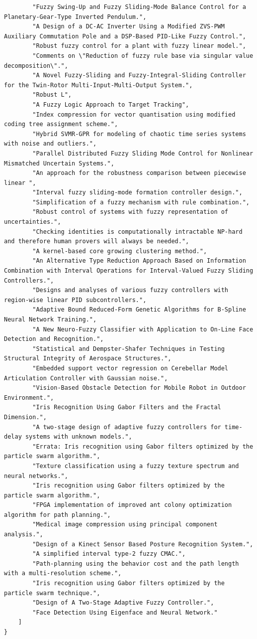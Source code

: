 \begin{verbatim}
        "Fuzzy Swing-Up and Fuzzy Sliding-Mode Balance Control for a Planetary-Gear-Type Inverted Pendulum.", 
        "A Design of a DC-AC Inverter Using a Modified ZVS-PWM Auxiliary Commutation Pole and a DSP-Based PID-Like Fuzzy Control.", 
        "Robust fuzzy control for a plant with fuzzy linear model.", 
        "Comments on \"Reduction of fuzzy rule base via singular value decomposition\".", 
        "A Novel Fuzzy-Sliding and Fuzzy-Integral-Sliding Controller for the Twin-Rotor Multi-Input-Multi-Output System.", 
        "Robust L", 
        "A Fuzzy Logic Approach to Target Tracking", 
        "Index compression for vector quantisation using modified coding tree assignment scheme.", 
        "Hybrid SVMR-GPR for modeling of chaotic time series systems with noise and outliers.", 
        "Parallel Distributed Fuzzy Sliding Mode Control for Nonlinear Mismatched Uncertain Systems.", 
        "An approach for the robustness comparison between piecewise linear ", 
        "Interval fuzzy sliding-mode formation controller design.", 
        "Simplification of a fuzzy mechanism with rule combination.", 
        "Robust control of systems with fuzzy representation of uncertainties.", 
        "Checking identities is computationally intractable NP-hard and therefore human provers will always be needed.", 
        "A kernel-based core growing clustering method.", 
        "An Alternative Type Reduction Approach Based on Information Combination with Interval Operations for Interval-Valued Fuzzy Sliding Controllers.", 
        "Designs and analyses of various fuzzy controllers with region-wise linear PID subcontrollers.", 
        "Adaptive Bound Reduced-Form Genetic Algorithms for B-Spline Neural Network Training.", 
        "A New Neuro-Fuzzy Classifier with Application to On-Line Face Detection and Recognition.", 
        "Statistical and Dempster-Shafer Techniques in Testing Structural Integrity of Aerospace Structures.", 
        "Embedded support vector regression on Cerebellar Model Articulation Controller with Gaussian noise.", 
        "Vision-Based Obstacle Detection for Mobile Robot in Outdoor Environment.", 
        "Iris Recognition Using Gabor Filters and the Fractal Dimension.", 
        "A two-stage design of adaptive fuzzy controllers for time-delay systems with unknown models.", 
        "Errata: Iris recognition using Gabor filters optimized by the particle swarm algorithm.", 
        "Texture classification using a fuzzy texture spectrum and neural networks.", 
        "Iris recognition using Gabor filters optimized by the particle swarm algorithm.", 
        "FPGA implementation of improved ant colony optimization algorithm for path planning.", 
        "Medical image compression using principal component analysis.", 
        "Design of a Kinect Sensor Based Posture Recognition System.", 
        "A simplified interval type-2 fuzzy CMAC.", 
        "Path-planning using the behavior cost and the path length with a multi-resolution scheme.", 
        "Iris recognition using Gabor filters optimized by the particle swarm technique.", 
        "Design of A Two-Stage Adaptive Fuzzy Controller.", 
        "Face Detection Using Eigenface and Neural Network."
    ]
}
\end{verbatim}


